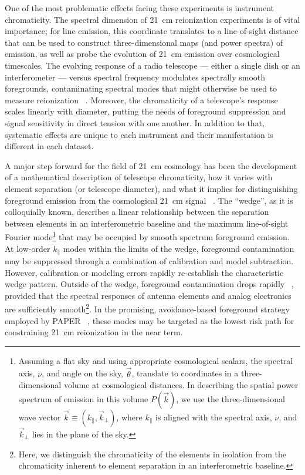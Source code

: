\documentclass[twocolumn]{emulateapj}
\begin{document}
One of the most problematic effects facing these experiments is instrument
chromaticity.  The spectral dimension of 21~cm reionization experiments is of vital
importance; for line emission, this coordinate translates to a line-of-sight distance
that can be used to construct three-dimensional maps (and power spectra) of emission,
as well as probe the evolution of 21~cm emission over cosmological timescales.
The evolving response of a radio telescope --- either a single dish
or an interferometer --- versus spectral frequency modulates spectrally smooth foregrounds,
contaminating spectral modes that might
otherwise be used to measure reionization ~\citep{XXX}.  Moreover, the chromaticity of
a telescope's response scales linearly with diameter, putting the
needs of foreground suppression and signal sensitivity in direct tension with one
another. In addition to that, systematic effects are unique to each instrument and their manifestation 
is different in each dataset.

A major step forward for the field of 21~cm cosmology has been the development
of a mathematical description of telescope chromaticity, how it varies with
element separation (or telescope diameter), and what it implies for distinguishing
foreground emission from the cosmological 21~cm signal ~\citep{XXX}.  The ``wedge'', as it is
colloquially known, describes a linear relationship between the separation between elements
in an interferometric baseline and the maximum line-of-sight Fourier mode\footnote{Assuming
a flat sky and using appropriate
cosmological scalars,
the spectral axis, $\nu$, and angle on the sky, $\vec\theta$, translate to coordinates in
a three-dimensional volume at cosmological distances.  In describing the spatial power spectrum of
emission in this volume $P(\vec k)$, we use the three-dimensional wave vector 
$\vec k\equiv(k_\parallel,\vec k_\perp)$, where $k_\parallel$ is aligned with the
spectral axis, $\nu$, and $\vec k_\perp$ lies in the plane of the sky.}
that may be occupied by smooth spectrum foreground emission.  At low-order $k_\parallel$ modes
within the limits of the wedge,
foreground contamination may be suppressed through a combination of calibration and model 
subtraction.  However, calibration or modeling errors rapidly re-establish the characteristic
wedge pattern.  Outside of the wedge, foreground contamination drops rapidly 
~\citep{pober_et_al2013,thargarajan_et_al2015}, provided that the spectral responses
of antenna elements and analog electronics are sufficiently smooth\footnote{Here, we distinguish
the chromaticity of the elements in isolation from the chromaticity inherent to
element separation in an interferometric baseline.}.  In the promising, avoidance-based
foreground strategy employed by PAPER ~\citep{parsons_et_al2014,ali_et_al2015}, these modes
may be targeted as the lowest risk path for constraining 21~cm reionization in the near term.
  
\end{document}
